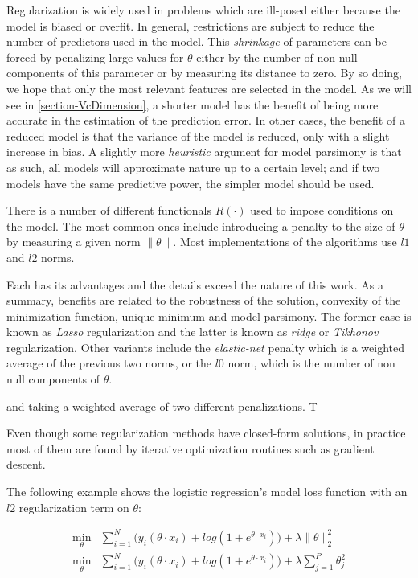 Regularization is widely used in problems which are ill-posed either because the model is biased or overfit. In general, restrictions are subject to reduce the number of predictors used in the model. This \textit{shrinkage} of parameters can be forced by penalizing large values for $\theta$ either by the number of non-null components of this parameter or by measuring its distance to zero. By so doing, we hope that only the most relevant features are selected in the model. As we will see in \cref{section-VcDimension}, a shorter model has the benefit of being more accurate in the estimation of the prediction error. In other cases, the benefit of a reduced model is that the variance of the model is reduced, only with a slight increase in bias. A slightly more \textit{heuristic} argument for model parsimony is that as such, all models will approximate nature up to a certain level; and if two models have the same predictive power, the simpler model should be used.


There is a number of different functionals $R(\cdot)$ used to impose conditions on the model. The most common ones include introducing a penalty to the size of $\theta$ by measuring a given norm $\| \theta \|$. Most implementations of the algorithms use $l1$ and $l2$ norms.

Each has its advantages and the details exceed the nature of this work. As a summary, benefits are related to the robustness of the solution, convexity of the minimization function, unique minimum and model parsimony. The former case is known as \textit{ Lasso} regularization and the latter is known as \textit{ridge} or \textit{Tikhonov} regularization. Other variants include the \textit{elastic-net} penalty which is a weighted average of the previous two norms, or the $l0$ norm, which is the number of non null components of $\theta$.


and taking a weighted average of two different penalizations. T

Even though some regularization methods have closed-form solutions, in practice most of them are found by iterative optimization routines such as gradient descent.

The following example shows the logistic regression's model loss function with an $l2$ regularization term on $\theta$:

\begin{equation} \label{logitRegularization}
\begin{split}
\min_{\theta} & \sum_{i=1}^N \big(y_i ( \theta \cdot x_i ) + log(1 + e^{\theta \cdot x_i} ) \big) + \lambda \| \theta\|_{2}^2 \\
\min_{\theta} & \sum_{i=1}^N \big(y_i ( \theta \cdot x_i ) + log(1 + e^{\theta \cdot x_i} ) \big) + \lambda \sum_{j=1}^P \theta_j^2
\end{split}
\end{equation}


